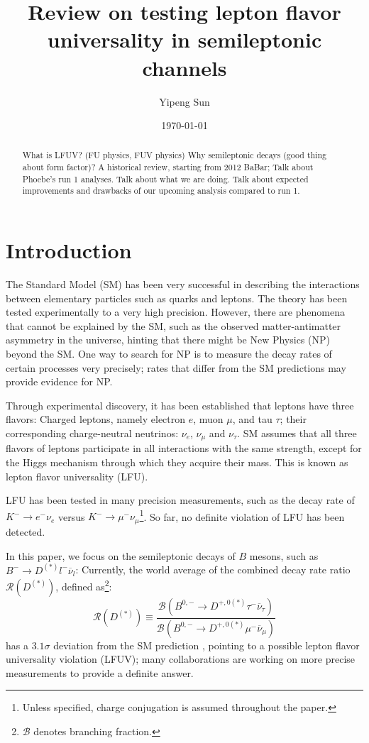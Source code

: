 \documentclass[12pt,letterpaper]{article}
\title{Review on testing lepton flavor universality in semileptonic channels}
\author{Yipeng Sun}
\affil{Department of Physics, University of Maryland}
\date{\today}
\def\RDDst/{\ensuremath{\mathcal{R}(D^{(*)})}}
\begin{document}
\maketitle

\begin{abstract}
    What is LFUV? (FU physics, FUV physics)
    Why semileptonic decays (good thing about form factor)?
    A historical review, starting from 2012 BaBar;
    Talk about Phoebe's run 1 analyses.
    Talk about what we are doing.
    Talk about expected improvements and drawbacks of our upcoming analysis compared
    to run 1.
\end{abstract}

\section{Introduction}
The Standard Model (SM) has been very successful in describing the interactions
between elementary particles such as quarks and leptons.
The theory has been tested experimentally to a very high precision.
However, there are phenomena that cannot be explained by the SM, such as
the observed matter-antimatter asymmetry in the universe, hinting that there might be New Physics (NP) beyond the SM.
One way to search for NP is to measure the decay rates of certain processes
very precisely;
rates that differ from the SM predictions may provide evidence for NP.

Through experimental discovery, it has been established that leptons have three
flavors:
Charged leptons, namely electron $e$, muon $\mu$, and tau $\tau$;
their corresponding charge-neutral neutrinos: $\nu_e$, $\nu_\mu$ and $\nu_\tau$.
SM assumes that all three flavors of leptons participate in all
interactions with the same strength, except for the Higgs mechanism through which
they acquire their mass.
This is known as lepton flavor universality (LFU).

LFU has been tested in many precision measurements, such as the decay rate
of $K^- \rightarrow e^- \nu_e$ versus $K^- \rightarrow \mu^- \nu_\mu$\footnote{
    Unless specified, charge conjugation is assumed throughout the paper.
}.
So far, no definite violation of LFU has been detected.

In this paper, we focus on the semileptonic decays of $B$ mesons, such as
$B^- \rightarrow D^{(*)} l^- \overline{\nu}_l$:
Currently, the world average of the combined decay rate ratio $\RDDst/$,
defined as\footnote{
    $\mathcal{B}$ denotes branching fraction.
}:
\begin{equation*}
    \RDDst/ \equiv \frac{
        \mathcal{B}\left(
            B^{0,-} \rightarrow D^{+,0(*)} \tau^- \overline{\nu}_\tau
        \right)
    }{
        \mathcal{B}\left(
            B^{0,-} \rightarrow D^{+,0(*)} \mu^- \overline{\nu}_\mu
        \right)
    }
\end{equation*}
has a $3.1\sigma$ deviation from the SM prediction \cite{HFLAV:2019}, pointing
to a possible lepton flavor universality violation (LFUV);
many collaborations are working on more precise measurements to provide a
definite answer.
\end{document}
